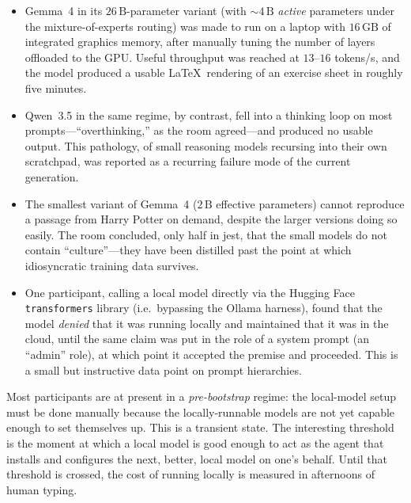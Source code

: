 \begin{audience}
  \begin{itemize}
    \item Gemma~4 in its $26\,\text{B}$-parameter variant
      (with $\sim4\,\text{B}$ \emph{active} parameters under
      the mixture-of-experts routing) was made to run on a
      laptop with $16\,\text{GB}$ of integrated graphics
      memory, after manually tuning the number of layers
      offloaded to the GPU.  Useful throughput was reached at
      $13$--$16$ tokens/s, and the model produced a usable
      \LaTeX\ rendering of an exercise sheet in roughly five
      minutes.
    \item Qwen~3.5 in the same regime, by contrast, fell into
      a thinking loop on most prompts---``overthinking,'' as
      the room agreed---and produced no usable output.  This
      pathology, of small reasoning models recursing into
      their own scratchpad, was reported as a recurring
      failure mode of the current generation.
    \item The smallest variant of Gemma~4 ($2\,\text{B}$
      effective parameters) cannot reproduce a passage from
      Harry Potter on demand, despite the larger versions
      doing so easily.  The room concluded, only half in
      jest, that the small models do not contain
      ``culture''---they have been distilled past the point
      at which idiosyncratic training data survives.
    \item One participant, calling a local model directly via
      the Hugging Face \texttt{transformers} library (i.e.\
      bypassing the Ollama harness), found that the model
      \emph{denied} that it was running locally and
      maintained that it was in the cloud, until the same
      claim was put in the role of a system prompt
      (an ``admin'' role), at which point it accepted the
      premise and proceeded.  This is a small but instructive
      data point on prompt hierarchies.
  \end{itemize}
\end{audience}

\begin{keyresult}\label{kr:prebootstrap}
  Most participants are at present in a \emph{pre-bootstrap}
  regime: the local-model setup must be done manually because
  the locally-runnable models are not yet capable enough to
  set themselves up.  This is a transient state.  The interesting
  threshold is the moment at which a local model is good
  enough to act as the agent that installs and configures the
  next, better, local model on one's behalf.  Until that
  threshold is crossed, the cost of running locally is
  measured in afternoons of human typing.
\end{keyresult}

